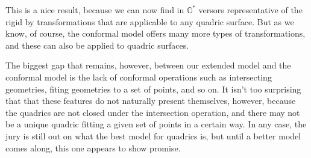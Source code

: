 \documentclass{birkjour}
\theoremstyle{definition}
\theoremstyle{remark}
\numberwithin{equation}{section}
\newcommand{\G}{\mathbb{G}}
\begin{document}
This is a nice result, because we can now find in $\G^*$ versors representative of the
rigid by transformations that are applicable to any quadric surface.  But as we know, of course, the
conformal model offers many more types of transformations, and these can also be
applied to quadric surfaces.

The biggest gap that remains, however, between our extended model and
the conformal model is the lack of conformal operations such as intersecting geometries, fiting geometries
to a set of points, and so on.  It isn't too surprising that that these features do not
naturally present themselves, however, because the quadrics are not closed under
the intersection operation, and there may not be a unique quadric fitting a given set
of points in a certain way.  In any case, the jury is still out on what the
best model for quadrics is, but until a better model comes along, this one appears
to show promise.



\end{document}
